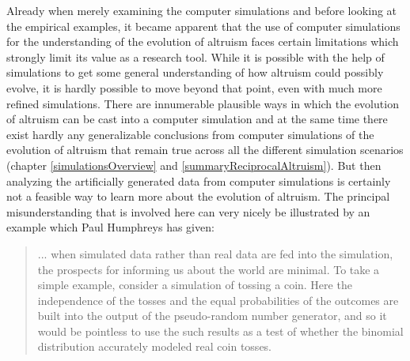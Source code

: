 Already when merely examining the computer simulations and before looking at
the empirical examples, it became apparent that the use of computer
simulations for the understanding of the evolution of altruism faces certain
limitations which strongly limit its value as a research tool. While it is
possible with the help of simulations to get some general understanding of
how altruism could possibly evolve, it is hardly possible to move beyond that
point, even with much more refined simulations. There are innumerable
plausible ways in which the evolution of altruism can be cast into a computer
simulation and at the same time there exist hardly any generalizable
conclusions from computer simulations of the evolution of altruism that remain
true across all the different simulation scenarios (chapter
\ref{simulationsOverview} and \ref{summaryReciprocalAltruism}). But then
analyzing the artificially generated data from computer simulations is
certainly not a feasible way to learn more about the evolution of altruism. The
principal misunderstanding that is involved here can very nicely be
illustrated by an example which Paul Humphreys has given:

\begin{quotation}
 ... when simulated data rather than real data are fed into the simulation,
the prospects for informing us about the world are minimal. To take a simple
example, consider a simulation of tossing a coin. Here the independence of the
tosses and the equal probabilities of the outcomes are built into the output
of the pseudo-random number generator, and so it would be pointless to use the
such results as a test of whether the binomial distribution accurately modeled
real coin tosses. \cite[p. 134/135]{humphreys:2004}
\end{quotation}

